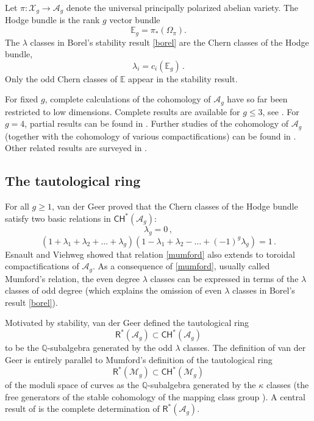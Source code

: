 \documentclass[11pt]{amsart}
\theoremstyle{definition}
\newcommand{\X}{\mathcal{X}}
\newcommand{\qq}{\mathbb{Q}}
\newcommand{\R}{\mathsf{R}}
\newcommand{\A}{\mathcal{A}}
\newcommand{\CH}{\mathsf{CH}}
\begin{document}
Let $\pi:\X_g\rightarrow \A_g$ denote the universal principally polarized abelian variety. The Hodge bundle is the rank $g$ vector bundle
\[
\mathbb{E}_g=\pi_{*} (\Omega_{\pi}) . 
\]
The $\lambda$ classes in Borel's
stability result \eqref{borel}
are the Chern classes of the
Hodge bundle,
$$\lambda_i= c_i(\mathbb{E}_g)\, .$$
Only the  odd Chern classes of $\mathbb{E}$ appear in
the stability result.

For fixed $g$, complete calculations of the cohomology of $\A_g$ have so far been restricted to low dimensions. Complete results are available for $g\leq3$, see \cite{H}. For $g=4$, partial results can be found in \cite {HT1}. Further studies of the cohomology of $\A_g$ (together with the
cohomology of various compactifications) can be found in \cite {GHT, BBC+, BCGP, toptop}.  Other related results are surveyed in \cite {HT2}. 


\subsection{The tautological ring} 
For all $g\geq 1$, 
van der Geer \cite{vdg}
proved that the Chern classes of
the Hodge bundle
satisfy two basic relations
in $\mathsf{CH}^*(\mathcal{A}_g)$:
\begin{equation} 
\label{lambdavanish}
\lambda_g=0\,,
\end{equation}
\begin{equation}
\label{mumford} (1+\lambda_1+\lambda_2+\ldots+\lambda_g)(1-\lambda_1+\lambda_2-\ldots+(-1)^g\lambda_g)=1\,.
\end{equation}
Esnault and Viehweg \cite{EV} showed that relation \eqref{mumford} also extends to toroidal compactifications of $\A_g.$
As a consequence  of \eqref{mumford}, usually called Mumford's relation, the even degree $\lambda$ classes can be expressed in terms of the $\lambda$ classes of odd degree  (which explains the omission
of even $\lambda$ classes in 
Borel's result \eqref{borel}).

Motivated by stability,
van der Geer \cite{vdg} defined the tautological ring $$\R^*(\A_g)\subset \CH^*(\A_g)$$ to be the $\qq$-subalgebra generated by the odd $\lambda$ classes.
The definition of van der Geer is entirely
parallel to  
Mumford's definition \cite{DMumford}
of the tautological ring
$$\R^*(\mathcal{M}_g)\subset \CH^*(\mathcal{M}_g)$$
of the moduli space of curves
as the $\qq$-subalgebra generated by the $\kappa$
classes (the free 
generators of the stable cohomology of
the mapping class group \cite{MadWeiss}).
A central result of \cite{vdg}
is the
 complete determination of
  $\R^*(\A_g)$.
\end{document}
